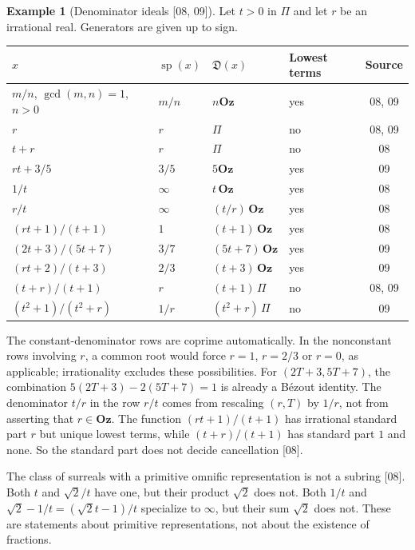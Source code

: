 \documentclass[11pt,oneside]{article}
\numberwithin{equation}{section}
\theoremstyle{definition}
\newtheorem{example}[example]{Example}
\theoremstyle{remark}
\newcommand{\Oz}{\mathbf{Oz}}
\newcommand{\src}[1]{\textup{\textsf{\small[#1]}}}
\newcommand{\Den}{\mathfrak D}
\newcommand{\spz}{\operatorname{sp}}
\begin{document}
\begin{example}[Denominator ideals \src{08, 09}]\label{odg:frac:ex:table}
Let $t>0$ in $\Pi$ and let $r$ be an irrational real. Generators are given up
to sign.
\begin{center}
\small
\renewcommand{\arraystretch}{1.15}
\begin{tabular}{@{}llllc@{}}
\toprule
$x$ & $\spz(x)$ & $\Den(x)$ & Lowest terms & Source\\
\midrule
$m/n$, $\gcd(m,n)=1$, $n>0$ & $m/n$ & $n\Oz$ & yes & 08, 09\\
$r$ & $r$ & $\Pi$ & no & 08, 09\\
$t+r$ & $r$ & $\Pi$ & no & 08\\
$rt+3/5$ & $3/5$ & $5\Oz$ & yes & 09\\
$1/t$ & $\infty$ & $t\,\Oz$ & yes & 08\\
$r/t$ & $\infty$ & $(t/r)\,\Oz$ & yes & 08\\
$(rt+1)/(t+1)$ & $1$ & $(t+1)\,\Oz$ & yes & 08\\
$(2t+3)/(5t+7)$ & $3/7$ & $(5t+7)\,\Oz$ & yes & 09\\
$(rt+2)/(t+3)$ & $2/3$ & $(t+3)\,\Oz$ & yes & 09\\
$(t+r)/(t+1)$ & $r$ & $(t+1)\,\Pi$ & no & 08, 09\\
$(t^2+1)/(t^2+r)$ & $1/r$ & $(t^2+r)\,\Pi$ & no & 09\\
\bottomrule
\end{tabular}
\end{center}
The constant-denominator rows are coprime automatically. In the nonconstant
rows involving $r$, a common root would force $r=1$, $r=2/3$ or $r=0$,
as applicable; irrationality excludes these possibilities. For
$(2T+3,5T+7)$, the combination $5(2T+3)-2(5T+7)=1$ is already a
B\'ezout identity. The denominator $t/r$ in the row $r/t$ comes from
rescaling $(r,T)$ by $1/r$, not from asserting that $r\in\Oz$. The
function $(rt+1)/(t+1)$ has irrational standard part $r$ but unique lowest
terms, while $(t+r)/(t+1)$ has standard part $1$ and none. So the standard part
does not decide cancellation \src{08}.
\end{example}

The class of surreals with a primitive omnific representation is not a
subring \src{08}. Both $t$ and $\sqrt2/t$ have one, but their product $\sqrt2$
does not. Both $1/t$ and $\sqrt2-1/t=(\sqrt2t-1)/t$ specialize to $\infty$, but
their sum $\sqrt2$ does not. These are statements about primitive
representations, not about the existence of fractions.
\end{document}
